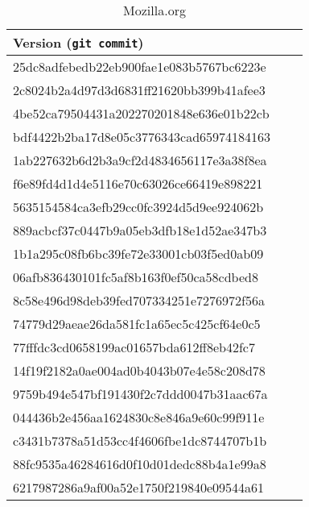 \begin{table}[h!]
{\begin{tabular}{l*{1}{l}r}
\hline
Version (\texttt{git commit})  \\
\hline
25dc8adfebedb22eb900fae1e083b5767bc6223e \\
2c8024b2a4d97d3d6831ff21620bb399b41afee3  \\
4be52ca79504431a202270201848e636e01b22cb \\
bdf4422b2ba17d8e05c3776343cad65974184163 \\
1ab227632b6d2b3a9cf2d4834656117e3a38f8ea \\
f6e89fd4d1d4e5116e70c63026ce66419e898221 \\
5635154584ca3efb29cc0fc3924d5d9ee924062b  \\
889acbcf37c0447b9a05eb3dfb18e1d52ae347b3 \\
1b1a295c08fb6bc39fe72e33001cb03f5ed0ab09  \\
06afb836430101fc5af8b163f0ef50ca58cdbed8  \\
8c58e496d98deb39fed707334251e7276972f56a  \\
74779d29aeae26da581fc1a65ec5c425cf64e0c5 \\
77fffdc3cd0658199ac01657bda612ff8eb42fc7  \\
14f19f2182a0ae004ad0b4043b07e4e58c208d78 \\
9759b494e547bf191430f2c7ddd0047b31aac67a \\
044436b2e456aa1624830c8e846a9e60c99f911e \\
c3431b7378a51d53cc4f4606fbe1dc8744707b1b  \\
88fc9535a46284616d0f10d01dedc88b4a1e99a8 \\
6217987286a9af00a52e1750f219840e09544a61 \\ 
\hline
\end{tabular}
\caption{Mozilla.org}
\label{bedrock}

}

\end{table}